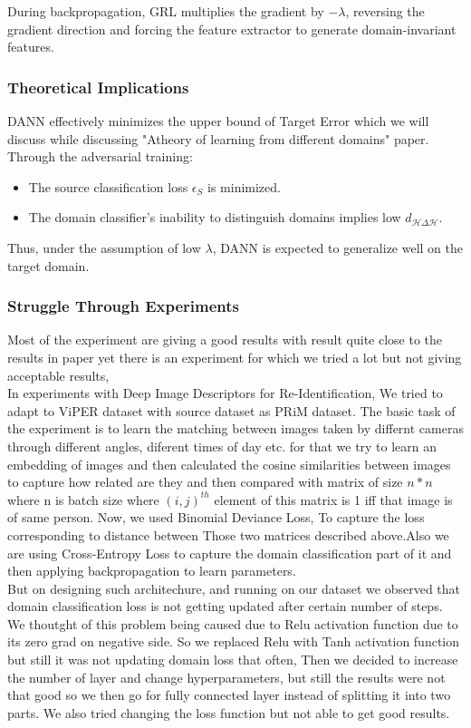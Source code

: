 \documentclass{article}
\begin{document}
During backpropagation, GRL multiplies the gradient by \(-\lambda\), reversing the gradient direction and forcing the feature extractor to generate domain-invariant features.

\subsubsection{Theoretical Implications}

DANN effectively minimizes the upper bound of Target Error which we will discuss while discussing "Atheory of learning from different domains" paper. Through the adversarial training:
\begin{itemize}[noitemsep]
    \item The source classification loss \( \epsilon_S \) is minimized.
    \item The domain classifier's inability to distinguish domains implies low \( d_{\mathcal{H}\Delta\mathcal{H}} \).
\end{itemize}

Thus, under the assumption of low \( \lambda \), DANN is expected to generalize well on the target domain.


\subsubsection{Struggle Through Experiments}
Most of the experiment are giving a good results with result quite close to the results in paper yet there is an experiment for which we tried a lot but not giving acceptable results,\\
In experiments with Deep Image Descriptors for Re-Identification, We tried to adapt to ViPER dataset with source dataset as PRiM dataset. The basic task of the experiment is to learn the matching between images taken by differnt cameras through different angles, diferent times of day etc.
for that we try to learn an embedding of images and then calculated the cosine similarities between images to capture how related are they and then compared with matrix of size $n*n$ where n is batch size where $(i,j)^{th}$ element of this matrix is 1 iff that image is of same person.
Now, we used Binomial Deviance Loss, To capture the loss corresponding to distance between Those two matrices described above.Also we are using Cross-Entropy Loss to capture the domain classification part of it and then applying backpropagation to learn parameters.\\
But on designing such architechure, and running on our dataset we observed that domain classification loss is not getting updated after certain number of steps. We thoutght of this problem being caused due to Relu activation function due to its zero grad on negative side. So we replaced Relu with Tanh activation function but still it was not updating domain loss that often, Then we decided to increase the number of layer and change hyperparameters, but still the results were not that good so we then go for fully connected layer instead of splitting it into two parts. We also tried changing the loss function but not able to get good results.
\end{document}
